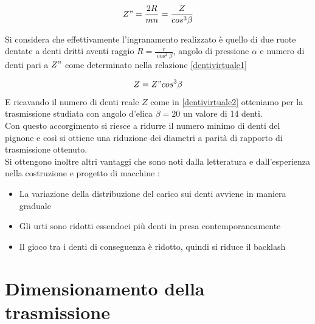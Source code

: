 \documentclass[%
corpo=11pt,
twoside,
 stile=classica,
oldstyle,
greek,%
]{toptesi}
\begin{document}
	\begin{equation}\label{dentivirtuale1}
	Z"=\frac{2R}{mn}=\frac{Z}{cos^3\beta}
	\end{equation}  
	
	Si considera che effettivamente l'ingranamento realizzato è quello di due ruote dentate a denti dritti aventi raggio $R=\frac{r}{\cos^2\beta}$, angolo di pressione $\alpha$ e numero di denti pari a $Z"$ come determinato nella relazione \ref{dentivirtuale1}
	
	\begin{equation}\label{dentivirtuale2}
	Z=Z" cos^3\beta
	\end{equation} 
	E ricavando il numero di denti reale $Z$ come in \ref{dentivirtuale2} otteniamo per la trasmissione studiata con angolo d'elica $\beta=20$ un valore di 14 denti. \\
	Con questo accorgimento si riesce a ridurre il numero minimo di denti del pignone e così si ottiene una riduzione dei diametri a parità di rapporto di trasmissione ottenuto.\\
	 Si ottengono inoltre altri vantaggi che sono noti dalla letteratura e dall'esperienza nella costruzione e progetto di macchine :
	\begin{itemize}
		\item La variazione della distribuzione del carico sui denti avviene in maniera graduale 
		\item Gli urti sono ridotti essendoci più denti in presa contemporaneamente
		\item Il gioco tra i denti di conseguenza è ridotto, quindi si riduce il backlash
	\end{itemize}

	\section{Dimensionamento della trasmissione}
	
\end{document}
